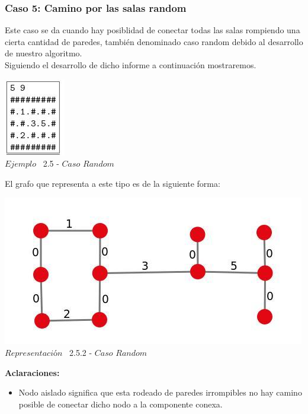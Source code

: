 \begin{center}
 \subsubsection*{Caso 5: Camino por las salas random}
\end{center}

Este caso se da cuando hay posiblidad de conectar todas las salas rompiendo una cierta cantidad de paredes, tambi\'en denominado caso random debido al desarrollo de nuestro algoritmo.\\

Siguiendo el desarrollo de dicho informe a continuaci\'on mostraremos.\\
 
\vspace*{0.3cm} \vspace*{0.3cm}
  \begin{center}
 \includegraphics[scale=1.6]{./EJ2/ej2random.jpeg}
\\ {$Ejemplo$ \ 2.5 - $Caso$ $Random$}
  \end{center}
  \vspace*{0.3cm}

El grafo que representa a este tipo es de la siguiente forma:\\

\vspace*{0.3cm} \vspace*{0.3cm}
  \begin{center}
 \includegraphics[scale=0.5]{./EJ2/ej2graforandom.jpeg}
 \\{$Representación$ \ 2.5.2 - $Caso$ $Random$}
  \end{center}
  \vspace*{0.3cm}


\textbf{Aclaraciones:} 
\begin{itemize}
\item Nodo aislado significa que esta rodeado de paredes irrompibles no hay camino posible de conectar dicho nodo a la componente conexa.
\end{itemize}